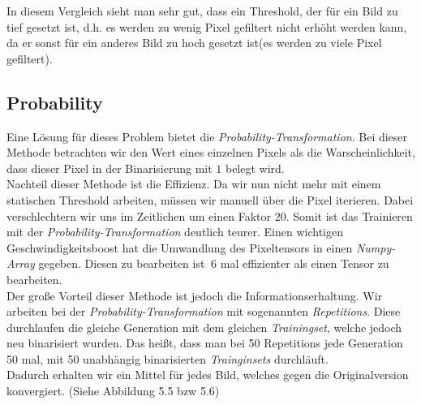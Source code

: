 In diesem Vergleich sieht man sehr gut, dass ein Threshold, der für ein Bild zu tief gesetzt ist, d.h. es werden zu wenig Pixel gefiltert nicht erhöht werden kann, da er sonst für ein anderes Bild zu hoch gesetzt ist(es werden zu viele Pixel gefiltert).\\

\subsection{Probability}

Eine Lösung für dieses Problem bietet die \textit{Probability-Transformation}. Bei dieser Methode betrachten wir den Wert eines einzelnen Pixels als die Warscheinlichkeit, dass dieser Pixel in der Binarisierung mit $1$ belegt wird.\\

Nachteil dieser Methode ist die Effizienz. Da wir nun nicht mehr mit einem statischen Threshold arbeiten, müssen wir manuell über die Pixel iterieren. Dabei verschlechtern wir uns im Zeitlichen um einen Faktor $20$. Somit ist das Trainieren mit der \textit{Probability-Transformation} deutlich teurer. Einen wichtigen Geschwindigkeitsboost hat die Umwandlung des Pixeltensors in einen \textit{Numpy-Array} gegeben. Diesen zu bearbeiten ist $~6$ mal effizienter als einen Tensor zu bearbeiten.\\

Der große Vorteil dieser Methode ist jedoch die Informationserhaltung. Wir arbeiten bei der \textit{Probability-Transformation} mit sogenannten \textit{Repetitions}. Diese durchlaufen die gleiche Generation mit dem gleichen \textit{Trainingset}, welche jedoch neu binarisiert wurden. Das heißt, dass man bei 50 Repetitions jede Generation 50 mal, mit 50 unabhängig binarisierten \textit{Trainginsets} durchläuft.\\Dadurch erhalten wir ein Mittel für jedes Bild, welches gegen die Originalversion konvergiert. (Siehe Abbildung 5.5 bzw 5.6)

